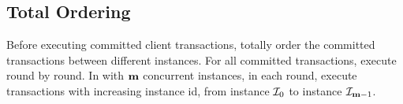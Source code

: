 \subsection{Total Ordering}

\par Before executing committed client transactions, \RCC{} totally order the committed transactions between different 
instances. For all committed transactions, \RCC{} execute round by round. In \RCC{} with $\mathbf{m}$ concurrent instances, in 
each round, \RCC{} execute transactions with increasing instance id, from instance $\mathcal{I}_{0}$ to instance $\mathcal{I}_{\mathbf{m}-1}$.

\par 